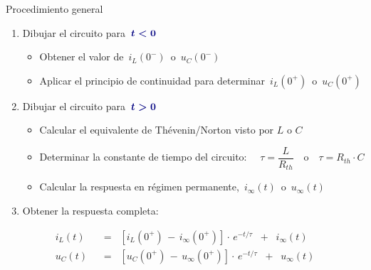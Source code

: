 \documentclass[aspectratio=169, usenames,svgnames,dvipsnames]{beamer}
\begin{document}
\begin{frame}{Procedimiento general}
    \vspace{3mm}
    \begin{enumerate}
        \item Dibujar el circuito para ${\boldsymbol{\color{blue!50!black} \, t < 0 \,}}$
        \begin{itemize}
            \normalsize

            \vspace{2mm}
            \item Obtener el valor de \(\, i_L(0^-) \,\) o \(\, u_C(0^-) \,\)

            \vspace{2mm}
            \item Aplicar el \alert{principio de continuidad} para determinar \(\, i_L(0^+) \,\) o \(\, u_C(0^+) \,\)
        \end{itemize}

        \vspace{4mm}
        \item Dibujar el circuito para ${\boldsymbol{\color{blue!50!black} \, t > 0 \,}}$
        \begin{itemize}
            \normalsize

            \vspace{1mm}
            \item Calcular el equivalente de \alert{Thévenin/Norton} visto por $L$ o $C$

            \vspace{2mm}
            \item Determinar la \alert{constante de tiempo} del circuito:
            $\quad \tau = \dfrac{L}{R_{th}} \quad\textrm{o}\quad \tau = R_{th}\cdot{C}$

            \vspace{2mm}
            \item Calcular la respuesta en \alert{régimen permanente}, \(\, i_\infty(t) \,\) o \(\, u_\infty(t) \,\)
        \end{itemize}

        \vspace{3mm}
        \item Obtener la \alert{respuesta completa}:
    \end{enumerate}

    \vspace{-6mm}
    \begin{align*}
        i_L(t) \;\;&=\;\; \left[i_L(0^+) \,-\, i_\infty(0^+)\right] \cdot \, e^{-t/\tau} \;\;+\;\; i_\infty(t)\\[4pt]
        u_C(t) \;\;&=\;\; \left[u_C(0^+) \,-\, u_\infty(0^+)\right] \cdot \, e^{-t/\tau} \;\;+\;\; u_\infty(t)\\
    \end{align*}
\end{frame}
\end{document}
